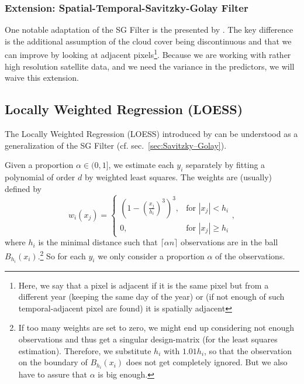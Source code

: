 		\subsubsection*{Extension: Spatial-Temporal-Savitzky-Golay Filter}
			One notable adaptation of the SG Filter is the presented by \cite{caoSimpleMethodImprove2018b}. The key difference is the additional assumption of the cloud cover being discontinuous and that we can improve by looking at adjacent pixels\footnote{Here, we say that a pixel is adjacent if it is the same pixel but from a different year (keeping the same day of the year) or (if not enough of such temporal-adjacent pixel are found) it is spatially adjacent}. Because we are working with rather high resolution satellite data, and we need the variance in the predictors, we will waive this extension.


	\subsection{Locally Weighted Regression (LOESS)}
		\label{sec:loess}

		The Locally Weighted Regression (LOESS) introduced by \cite{clevelandRobustLocallyWeighted1979} can be understood as a generalization of the SG Filter (cf. sec.~\ref{sec:Savitzky–Golay}).

		Given a proportion $\alpha \in (0,1]$, we estimate each $y_i$ separately by fitting a polynomial of order $d$ by weighted least squares. The weights are (usually) defined by
		$$w_i(x_j)=\begin{cases}
				\left(1-\left(\frac{x_j}{h_i}\right)^{3}\right)^{3}, & \text{for } |x_j|<h_i           \\
				0,                                                   & \text{for } |x_j| \geqslant h_i
			\end{cases} ,$$
		where $h_i$ is the minimal distance such that $\lceil \alpha n\rceil$ observations are in the ball $B_{h_i}(x_i)$.\footnote{\label{footnote:LOESS}If too many weights are set to zero, we might end up considering not enough observations and thus get a singular design-matrix (for the least squares estimation). Therefore, we substitute $h_i$ with $1.01 h_i$, so that the observation on the boundary of $B_{h_i}(x_i)$ does not get completely ignored. But we also have to assure that $\alpha$ is big enough.} So for each $y_i$ we only consider a proportion $\alpha$ of the observations.


